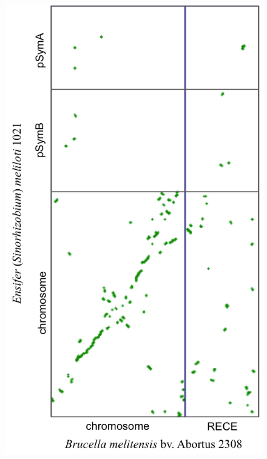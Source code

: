 \begin{figure}[H]
\begin{center}
\hspace*{-3cm}
	\begin{minipage}{0.5\textwidth}
		\includegraphics[width=\textwidth]{./img/synteny/new/fig8_8c.png}
		\label{figsyntbruc3}
	\end{minipage}
	\begin{minipage}{0.5\textwidth}

\end{minipage}
\end{center}
\end{figure}
